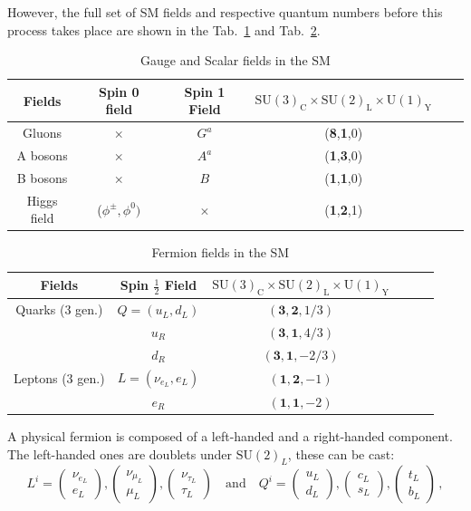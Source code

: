\documentclass[10pt]{report}
\begin{document}
However, the full set of SM fields and respective quantum numbers before this process takes place are shown in the Tab.~\ref{table1} and Tab.~\ref{table2}. 
%
\begin{table}[!htb]
	\centering
	\caption{Gauge and Scalar fields in the SM}
	\label{table1}
	\begin{tabular}{@{}cccccc@{}}
		\hline	
		Fields & Spin 0 field & Spin 1 Field & $ \mathrm{ SU(3)_C \times SU(2)_L \times U(1)_Y } $  \\
		\hline	
		Gluons  & $\times$  & $G^a$ & (\textbf{8},\textbf{1},0) \\	
		A bosons & $\times$  & $A^a$ & (\textbf{1},\textbf{3},0)   \\
		B bosons & $\times$  & $B$   & (\textbf{1},\textbf{1},0)   \\
		Higgs field & ($\phi^\pm, \phi^0 )$  & $\times$ & (\textbf{1},\textbf{2},1) \\ \hline
	\end{tabular}
\end{table}
%
\begin{table}[!htb]
	\centering
	\caption{Fermion fields in the SM}
	\label{table2}
	\begin{tabular}{@{}cccccc@{}}
		\hline	
		Fields & Spin $\frac{1}{2}$ Field & $\mathrm{ SU(3)_C \times SU(2)_L \times U(1)_Y} $   \\
		\hline	
		Quarks (3 gen.) & $Q=(u_L,d_L)$ & $(\mathbf{3},\mathbf{2},{1}/{3})$ \\	
		$\quad$        & $u_R$ & $(\mathbf{3},\mathbf{1},{4}/{3})$   \\
		$\quad$   & $d_R$ & $(\mathbf{3},\mathbf{1}, -{2}/{3})$   \\
		Leptons (3 gen.) & $L=(\nu_{e_L}, e_L )$ & $(\mathbf{1},\mathbf{2},-1)$  \\
		$\quad$   & $e_R$ & $(\mathbf{1},\mathbf{1},-2)   $ \\ \hline
	\end{tabular}
\end{table}
%
A physical fermion is composed of a left-handed and a right-handed component. The left-handed ones are doublets under $\mathrm{SU(2)}_L$, these can be cast: 
%
\begin{equation}
L^i= \begin{pmatrix}
\nu_{e_L} \\ e_L 
\end{pmatrix},
\begin{pmatrix}
\nu_{\mu_L} \\ \mu_L 
\end{pmatrix},
\begin{pmatrix}
\nu_{\tau_L} \\ \tau_L 
\end{pmatrix} 
\quad 
\text{and} \quad Q^i= \begin{pmatrix}
u_{L} \\
d_L 
\end{pmatrix},\begin{pmatrix}
c_{L} \\
s_L 
\end{pmatrix}
,\begin{pmatrix}
t_{L} \\
b_L 
\end{pmatrix} \, ,
\end{equation}
\end{document}
